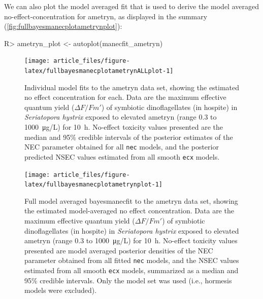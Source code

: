 \documentclass[
  shortnames]{jss}
\begin{document}
We can also plot the model averaged fit that is used to derive the model averaged no-effect-concentration for ametryn, as displayed in the summary (\autoref{fig:fullbayesmanecplotametrynplot}):

\begin{CodeChunk}
\begin{CodeInput}
R> ametryn_plot <- autoplot(manecfit_ametryn)
\end{CodeInput}
\end{CodeChunk}

\begin{CodeChunk}
\begin{figure}[!ht]

{\centering \texttt{[image: article\_files/figure-latex/fullbayesmanecplotametrynALLplot-1]} 

}

\caption{Individual model fits to the ametryn data set, showing the estimated no effect concentration for each. Data are the maximum effective quantum yield ($\Delta F / Fm'$) of symbiotic dinoflagellates (in hospite) in \textit{Seriatopora hystrix} exposed to elevated ametryn (range 0.3 to \SI{1000}{\micro\gram/\liter}) for \SI{10}{\hour}. No-effect toxicity values presented are the median and 95\% credible intervals of the posterior estimates of the NEC parameter obtained for all \texttt{nec} models, and the posterior predicted NSEC values estimated from all smooth \texttt{ecx} models.}\label{fig:fullbayesmanecplotametrynALLplot}
\end{figure}
\end{CodeChunk}

\begin{CodeChunk}
\begin{figure}[!ht]

{\centering \texttt{[image: article\_files/figure-latex/fullbayesmanecplotametrynplot-1]} 

}

\caption{Full model averaged bayesmanecfit to the ametryn data set, showing the estimated model-averaged no effect concentration. Data are the maximum effective quantum yield ($\Delta F / Fm'$) of symbiotic dinoflagellates (in hospite) in \textit{Seriatopora hystrix} exposed to elevated ametryn (range 0.3 to \SI{1000}{\micro\gram/\liter}) for \SI{10}{\hour}. No-effect toxicity values presented are model averaged posterior densities of the NEC parameter obtained from all fitted \texttt{nec} models, and the NSEC values estimated from all smooth \texttt{ecx} models, summarized as a median and 95\% credible intervals. Only the  model set was used (i.e., hormesis models were excluded).}\label{fig:fullbayesmanecplotametrynplot}
\end{figure}
\end{CodeChunk}
\end{document}

